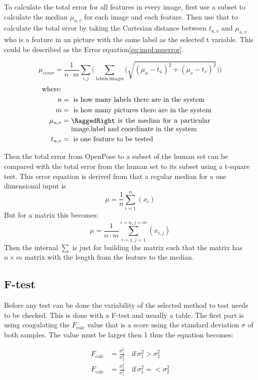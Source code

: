 To calculate the total error for all features in every image, first use a subset to calculate the median \(\mu_{u,v}\) for each image and each feature.
Then use that to calculate the total error by taking the Cartesian distance between \(t_{u,v}\) and \(\mu_{u,v}\) who is a feature in an picture with the same label as the selected t variable.
This could be described as the Error equation\ref{eq:impl:muerror}.


\begin{equation}\label{eq:impl:muerror}
\mu_{error} = \frac{1}{n\cdot m} \sum_{i,j} \Bigg(\sum_{\text{labels},\text{images}} \bigg(\sqrt{(\mu_u - t_u)^2 + (\mu_v - t_v)^2 }\bigg)\Bigg)
\end{equation}
\begin{align*}
    \text{where:}\\
    n &= \text{ is how many labels there are in the system}\\
    m &= \text{ is how many pictures there are in the system}\\
    \mu_{u,v} &= \parbox[t]{7cm}{\RaggedRight is the median for a particular image,label and coordinate in the system}\\
    t_{u,v} &= \text{ is one feature to be tested}
\end{align*}
\par
Then the total error from OpenPose to a subset of the human set can be compared with the total error from the human set to its subset using a t-square test.
This error equation is derived from that a regular median for a one dimensional input is
\[
\mu = \frac{1}{n}\sum_{i=1}^n (x_i)
\]
But for a matrix this becomes:
\[
\mu = \frac{1}{n\cdot m} \sum_{i=1,j=1}^{i=n,j=m}(x_{i,j})
\]
Then the internal \(\sum\) is just for building the matrix such that the matrix has \(n\times m\) matrix with the length from the feature to the median.

\subsection{F-test}\label{sub:implemnt:ftest}
Before any test can be done the variability of the selected method to test needs to be checked.
This is done with a F-test and usually a table.
The first part is using coagulating the $F_{\text{calc}}$ value that is a score using the standard deviation $\sigma$ of both samples.
The value must be larger then 1 thus the equation becomes:

\begin{align*}
F_{\text{calc}} &= \frac{\sigma^2_1}{\sigma^2_2}\quad\text{if}\, \sigma^2_1 > \sigma^2_2\\
F_{\text{calc}} &= \frac{\sigma^2_2}{\sigma^2_1}\quad\text{if}\, \sigma^2_1 =< \sigma^2_2\\
\end{align*}

